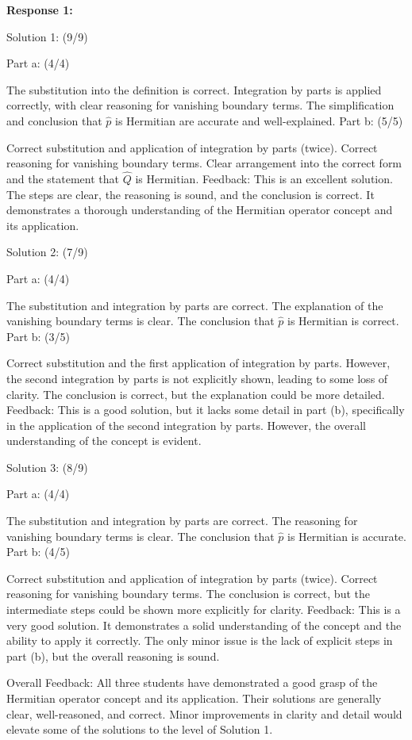 \documentclass[a4paper,11pt]{article}
\begin{document}
\textbf{Response 1:}

Solution 1: (9/9)

Part a: (4/4)

The substitution into the definition is correct.
Integration by parts is applied correctly, with clear reasoning for vanishing boundary terms.
The simplification and conclusion that \(\hat{p}\) is Hermitian are accurate and well-explained.
Part b: (5/5)

Correct substitution and application of integration by parts (twice).
Correct reasoning for vanishing boundary terms.
Clear arrangement into the correct form and the statement that \(\hat{Q}\) is Hermitian.
Feedback: This is an excellent solution. The steps are clear, the reasoning is sound, and the conclusion is correct. It demonstrates a thorough understanding of the Hermitian operator concept and its application.

Solution 2: (7/9)

Part a: (4/4)

The substitution and integration by parts are correct.
The explanation of the vanishing boundary terms is clear.
The conclusion that \(\hat{p}\) is Hermitian is correct.
Part b: (3/5)

Correct substitution and the first application of integration by parts.
However, the second integration by parts is not explicitly shown, leading to some loss of clarity.
The conclusion is correct, but the explanation could be more detailed.
Feedback: This is a good solution, but it lacks some detail in part (b), specifically in the application of the second integration by parts. However, the overall understanding of the concept is evident.

Solution 3: (8/9)

Part a: (4/4)

The substitution and integration by parts are correct.
The reasoning for vanishing boundary terms is clear.
The conclusion that \(\hat{p}\) is Hermitian is accurate.
Part b: (4/5)

Correct substitution and application of integration by parts (twice).
Correct reasoning for vanishing boundary terms.
The conclusion is correct, but the intermediate steps could be shown more explicitly for clarity.
Feedback: This is a very good solution. It demonstrates a solid understanding of the concept and the ability to apply it correctly. The only minor issue is the lack of explicit steps in part (b), but the overall reasoning is sound.

Overall Feedback: All three students have demonstrated a good grasp of the Hermitian operator concept and its application. Their solutions are generally clear, well-reasoned, and correct. Minor improvements in clarity and detail would elevate some of the solutions to the level of Solution 1.
\end{document}
